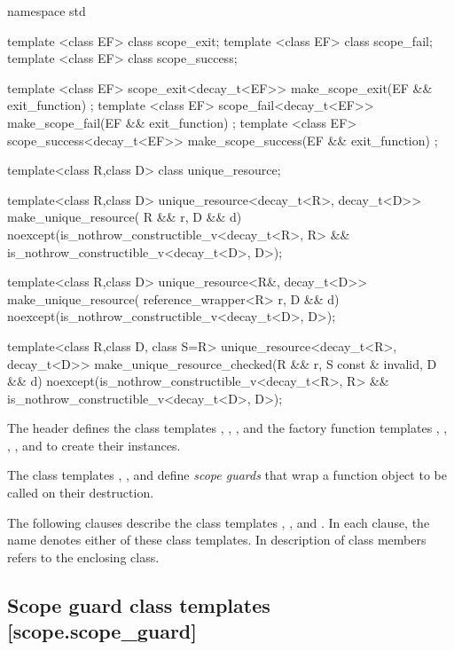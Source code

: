 \documentclass[ebook,11pt,article]{memoir}
\begin{document}
\begin{codeblock}
namespace std {
template <class EF>
class scope_exit;
template <class EF>
class scope_fail;
template <class EF>
class scope_success;

template <class EF>
scope_exit<decay_t<EF>> make_scope_exit(EF && exit_function) ;
template <class EF>
scope_fail<decay_t<EF>> make_scope_fail(EF && exit_function) ;
template <class EF>
scope_success<decay_t<EF>> make_scope_success(EF && exit_function) ;

template<class R,class D>
class unique_resource;

template<class R,class D>
unique_resource<decay_t<R>, decay_t<D>>
make_unique_resource( R &&  r, D && d) 
noexcept(is_nothrow_constructible_v<decay_t<R>, R> &&
         is_nothrow_constructible_v<decay_t<D>, D>);

template<class R,class D>
unique_resource<R&, decay_t<D>>
make_unique_resource( reference_wrapper<R>  r, D && d) 
noexcept(is_nothrow_constructible_v<decay_t<D>, D>);

template<class R,class D, class S=R>
unique_resource<decay_t<R>, decay_t<D>>
make_unique_resource_checked(R && r, S const & invalid, D && d) noexcept(is_nothrow_constructible_v<decay_t<R>, R> &&
         is_nothrow_constructible_v<decay_t<D>, D>);
}
\end{codeblock}

\pnum
The header   defines the class templates , , ,  
and the factory function templates , ,
,
, and   to create their instances.

\pnum 
The class templates , , and  define\emph{ scope guards} that wrap a function object to be called on their destruction.

\pnum
The following clauses describe the class templates , , and . In each clause, the name  denotes either of these class templates. In description of class members  refers to the enclosing class.

\subsection {Scope guard class templates [scope.scope_guard]}
\end{document}
